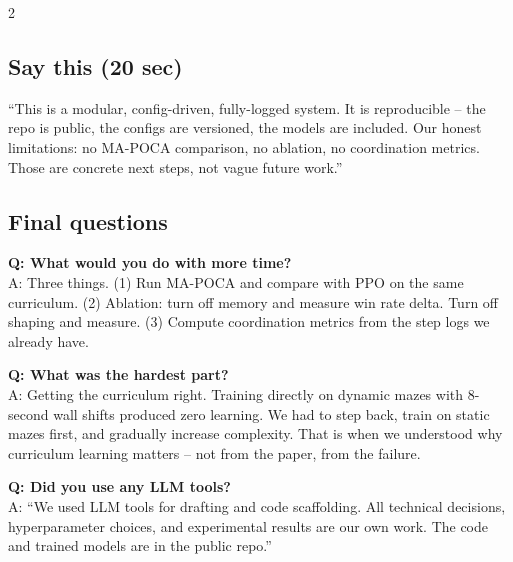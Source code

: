 \documentclass[9pt,a4paper]{article}
\begin{document}
\begin{multicols}{2}
\subsection{Say this (20 sec)}
``This is a modular, config-driven, fully-logged system. It is reproducible -- the repo is public, the configs are versioned, the models are included. Our honest limitations: no MA-POCA comparison, no ablation, no coordination metrics. Those are concrete next steps, not vague future work.''

\subsection{Final questions}
\textbf{Q: What would you do with more time?} \\
A: Three things. (1) Run MA-POCA and compare with PPO on the same curriculum. (2) Ablation: turn off memory and measure win rate delta. Turn off shaping and measure. (3) Compute coordination metrics from the step logs we already have.

\textbf{Q: What was the hardest part?} \\
A: Getting the curriculum right. Training directly on dynamic mazes with 8-second wall shifts produced zero learning. We had to step back, train on static mazes first, and gradually increase complexity. That is when we understood why curriculum learning matters -- not from the paper, from the failure.

\textbf{Q: Did you use any LLM tools?} \\
A: ``We used LLM tools for drafting and code scaffolding. All technical decisions, hyperparameter choices, and experimental results are our own work. The code and trained models are in the public repo.''

\end{multicols}
\end{document}
